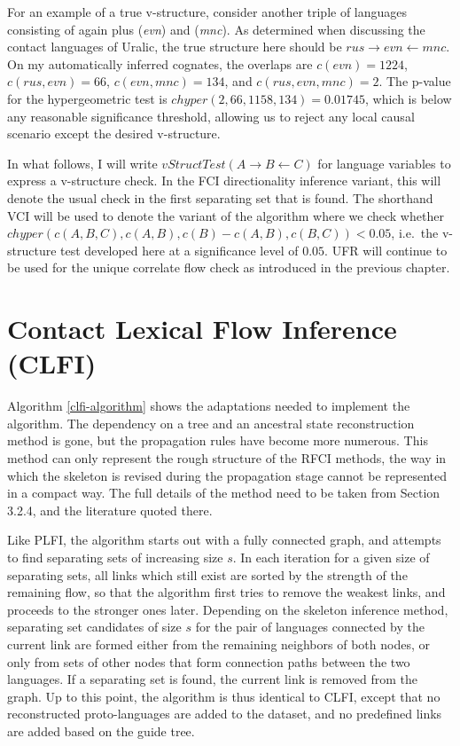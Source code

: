 For an example of a true v-structure, consider another triple of languages consisting of again  plus  (\textit{evn}) and  (\textit{mnc}). As determined when discussing the contact languages of Uralic, the true structure here should be $rus \rightarrow evn \leftarrow mnc$. On my automatically inferred cognates, the overlaps are $c(evn) = 1224$, $c(rus,evn) = 66$, $c(evn,mnc) = 134$, and $c(rus,evn,mnc) = 2$. The p-value for the hypergeometric test is $chyper(2, 66, 1158, 134) = 0.01745$, which is below any reasonable significance threshold, allowing us to reject any local causal scenario except the desired v-structure.

In what follows, I will write $vStructTest(A \rightarrow B \leftarrow C)$ for language variables to express a v-structure check. In the FCI directionality inference variant, this will denote the usual check in the first separating set that is found. The shorthand VCI will be used to denote the variant of the algorithm where we check whether $chyper(c(A,B,C),c(A,B),c(B)-c(A,B),c(B,C)) < 0.05$, i.e.\ the v-structure test developed here at a significance level of $0.05$. UFR will continue to be used for the unique correlate flow check as introduced in the previous chapter.

\section{Contact Lexical Flow Inference (CLFI)}
Algorithm \ref{clfi-algorithm} shows the adaptations needed to implement the  algorithm. The dependency on a tree and an ancestral state reconstruction method is gone, but the propagation rules have become more numerous. This method can only represent the rough structure of the RFCI methods, the way in which the skeleton is revised during the propagation stage cannot be represented in a compact way. The full details of the method need to be taken from Section 3.2.4, and the literature quoted there.

Like PLFI, the algorithm starts out with a fully connected graph, and attempts to find separating sets of increasing size $s$. In each iteration for a given size of separating sets, all links which still exist are sorted by the strength of the remaining flow, so that the algorithm first tries to remove the weakest links, and proceeds to the stronger ones later. Depending on the skeleton inference method, separating set candidates of size $s$ for the pair of languages connected by the current link are formed either from the remaining neighbors of both nodes, or only from sets of other nodes that form connection paths between the two languages. If a separating set is found, the current link is removed from the graph. Up to this point, the algorithm is thus identical to CLFI, except that no reconstructed proto-languages are added to the dataset, and no predefined links are added based on the guide tree.

